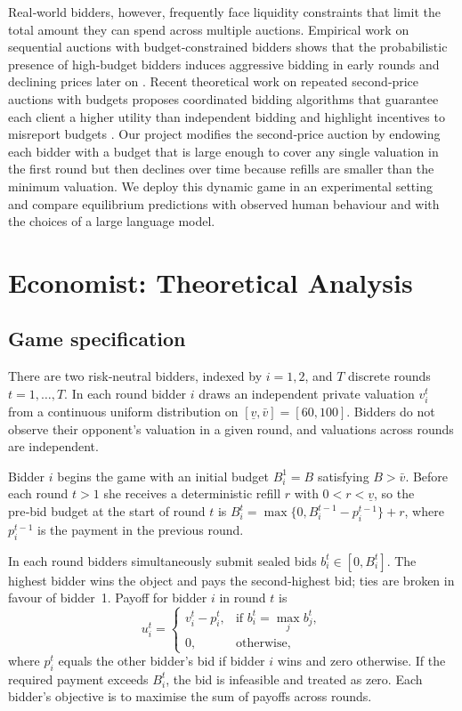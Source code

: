 Real‑world bidders, however, frequently face liquidity constraints that limit the total amount they can spend across multiple auctions.
Empirical work on sequential auctions with budget‑constrained bidders shows that the probabilistic presence of high‑budget bidders induces aggressive bidding in early rounds and declining prices later on \parencite{GhoshLiu2016}.
Recent theoretical work on repeated second‑price auctions with budgets proposes coordinated bidding algorithms that guarantee each client a higher utility than independent bidding and highlight incentives to misreport budgets \parencite{ChenEtAl2023}.
Our project modifies the second‑price auction by endowing each bidder with a budget that is large enough to cover any single valuation in the first round but then declines over time because refills are smaller than the minimum valuation.
We deploy this dynamic game in an experimental setting and compare equilibrium predictions with observed human behaviour and with the choices of a large language model.

\section{Economist: Theoretical Analysis}

\subsection{Game specification}
There are two risk‑neutral bidders, indexed by \(i=1,2\), and \(T\) discrete rounds \(t=1,\dots,T\).  In each round bidder \(i\) draws an independent private valuation \(v_i^t\) from a continuous uniform distribution on \([\underline{v},\bar{v}] = [60,100]\).  Bidders do not observe their opponent’s valuation in a given round, and valuations across rounds are independent.

Bidder \(i\) begins the game with an initial budget \(B_i^1 = B\) satisfying \(B > \bar{v}\).  Before each round \(t>1\) she receives a deterministic refill \(r\) with \(0 < r < \underline{v}\), so the pre‑bid budget at the start of round \(t\) is \(B_i^t = \max\{0, B_i^{t-1} - p_i^{t-1}\} + r\), where \(p_i^{t-1}\) is the payment in the previous round.

In each round bidders simultaneously submit sealed bids \(b_i^t \in [0, B_i^t]\).  The highest bidder wins the object and pays the second‑highest bid; ties are broken in favour of bidder~1.  Payoff for bidder \(i\) in round \(t\) is
\[
u_i^t =
\begin{cases}
v_i^t - p_i^t, & \text{if } b_i^t = \max_j b_j^t,\\
0, & \text{otherwise,}
\end{cases}
\]
where \(p_i^t\) equals the other bidder’s bid if bidder \(i\) wins and zero otherwise.  If the required payment exceeds \(B_i^t\), the bid is infeasible and treated as zero.  Each bidder’s objective is to maximise the sum of payoffs across rounds.

